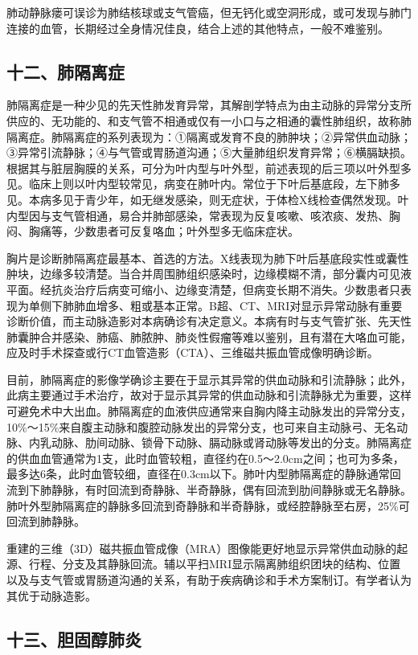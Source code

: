 肺动静脉瘘可误诊为肺结核球或支气管癌，但无钙化或空洞形成，或可发现与肺门连接的血管，长期经过全身情况佳良，结合上述的其他特点，一般不难鉴别。

\subsection{十二、肺隔离症}

肺隔离症是一种少见的先天性肺发育异常，其解剖学特点为由主动脉的异常分支所供应的、无功能的、和支气管不相通或仅有一小口与之相通的囊性肺组织，故称肺隔离症。肺隔离症的系列表现为：①隔离或发育不良的肺肿块；②异常供血动脉；③异常引流静脉；④与气管或胃肠道沟通；⑤大量肺组织发育异常；⑥横膈缺损。根据其与脏层胸膜的关系，可分为叶内型与叶外型，前述表现的后三项以叶外型多见。临床上则以叶内型较常见，病变在肺叶内。常位于下叶后基底段，左下肺多见。本病多见于青少年，如无继发感染，则无症状，于体检X线检查偶然发现。叶内型因与支气管相通，易合并肺部感染，常表现为反复咳嗽、咳浓痰、发热、胸闷、胸痛等，少数患者可反复咯血；叶外型多无临床症状。

胸片是诊断肺隔离症最基本、首选的方法。X线表现为肺下叶后基底段实性或囊性肿块，边缘多较清楚。当合并周围肺组织感染时，边缘模糊不清，部分囊内可见液平面。经抗炎治疗后病变可缩小、边缘变清楚，但病变长期不消失。少数患者只表现为单侧下肺肺血增多、粗或基本正常。B超、CT、MRI对显示异常动脉有重要诊断价值，而主动脉造影对本病确诊有决定意义。本病有时与支气管扩张、先天性肺囊肿合并感染、肺癌、肺脓肿、肺炎性假瘤等难以鉴别，且有潜在大咯血可能，应及时手术探查或行CT血管造影（CTA）、三维磁共振血管成像明确诊断。

目前，肺隔离症的影像学确诊主要在于显示其异常的供血动脉和引流静脉；此外，此病主要通过手术治疗，故对于显示其异常的供血动脉和引流静脉尤为重要，这样可避免术中大出血。肺隔离症的血液供应通常来自胸内降主动脉发出的异常分支，10\%～15\%来自腹主动脉和腹腔动脉发出的异常分支，也可来自主动脉弓、无名动脉、内乳动脉、肋间动脉、锁骨下动脉、膈动脉或肾动脉等发出的分支。肺隔离症的供血血管通常为1支，此时血管较粗，直径约在0.5～2.0cm之间；也可为多条，最多达6条，此时血管较细，直径在0.3cm以下。肺叶内型肺隔离症的静脉通常回流到下肺静脉，有时回流到奇静脉、半奇静脉，偶有回流到肋间静脉或无名静脉。肺叶外型肺隔离症的静脉多回流到奇静脉和半奇静脉，或经腔静脉至右房，25\%可回流到肺静脉。

重建的三维（3D）磁共振血管成像（MRA）图像能更好地显示异常供血动脉的起源、行程、分支及其静脉回流。辅以平扫MRI显示隔离肺组织团块的结构、位置以及与支气管或胃肠道沟通的关系，有助于疾病确诊和手术方案制订。有学者认为其优于动脉造影。

\subsection{十三、胆固醇肺炎}

